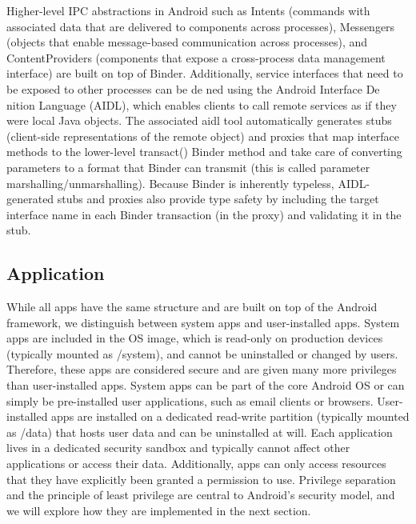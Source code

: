 Higher-level IPC abstractions in Android such as Intents (commands with associated data that are delivered to components across processes), Messengers (objects that enable message-based communication across processes), and ContentProviders (components that expose a cross-process data management interface) are built on top of Binder. Additionally, service interfaces that need to be exposed to other processes can be de ned using the Android Interface De nition Language (AIDL), which enables clients to call remote services as if they were local Java objects. The associated aidl tool automatically generates stubs (client-side representations of the remote object) and proxies that map interface methods to the lower-level transact() Binder method and take care of converting parameters to a format that Binder can transmit (this is called parameter marshalling/unmarshalling). Because Binder is inherently typeless, AIDL-generated stubs and proxies also provide type safety by including the target interface name in each Binder transaction (in the proxy) and validating it in the stub.

\subsection{Application} 

While all apps have the same structure and are built on top of the Android framework, we distinguish between system apps and user-installed apps. System apps are included in the OS image, which is read-only on production devices (typically mounted as /system), and cannot be uninstalled or changed by users. Therefore, these apps are considered secure and are given many more privileges than user-installed apps. System apps can be part of the core Android OS or can simply be pre-installed user applications, such as email clients or browsers. User-installed apps are installed on a dedicated read-write partition (typically mounted as /data) that hosts user data and can be uninstalled at will. Each application lives in a dedicated security sandbox and typically cannot affect other applications or access their data. Additionally, apps can only access resources that they have explicitly been granted a permission to use. Privilege separation and the principle of least privilege are central to Android’s security model, and we will explore how they are implemented in the next section. 


